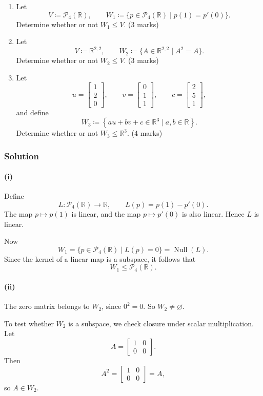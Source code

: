 \documentclass[12pt]{article}
\newcommand{\R}{\mathbb{R}}
\DeclareMathOperator{\Null}{Null}
\newcommand{\Pfour}{\mathcal{P}_4(\R)}
\begin{document}
\begin{enumerate}[label=(\roman*)]
\item Let
\[
V\coloneqq \Pfour,
\qquad
W_1\coloneqq \{p\in \Pfour \mid p(1)=p'(0)\}.
\]
Determine whether or not \(W_1\le V\).
\hfill (3 marks)

\item Let
\[
V\coloneqq \R^{2,2},
\qquad
W_2\coloneqq \{A\in \R^{2,2}\mid A^2=A\}.
\]
Determine whether or not \(W_2\le V\).
\hfill (3 marks)

\item Let
\[
u=\begin{bmatrix}1\\2\\0\end{bmatrix},
\qquad
v=\begin{bmatrix}0\\1\\1\end{bmatrix},
\qquad
c=\begin{bmatrix}2\\5\\1\end{bmatrix},
\]
and define
\[
W_3\coloneqq \left\{au+bv+c\in \R^3 \mid a,b\in\R\right\}.
\]
Determine whether or not \(W_3\le \R^3\).
\hfill (4 marks)
\end{enumerate}

\subsubsection{Solution}

\paragraph{(i)}
Define
\[
L:\Pfour \to \R,\qquad L(p)=p(1)-p'(0).
\]
The map \(p\mapsto p(1)\) is linear, and the map \(p\mapsto p'(0)\) is also linear. Hence \(L\) is linear.

Now
\[
W_1=\{p\in \Pfour\mid L(p)=0\}=\Null(L).
\]
Since the kernel of a linear map is a subspace, it follows that
\[
\boxed{W_1\le \Pfour.}
\]

\paragraph{(ii)}
The zero matrix belongs to \(W_2\), since \(0^2=0\). So \(W_2\neq\varnothing\).

To test whether \(W_2\) is a subspace, we check closure under scalar multiplication. Let
\[
A=\begin{bmatrix}1&0\\0&0\end{bmatrix}.
\]
Then
\[
A^2=\begin{bmatrix}1&0\\0&0\end{bmatrix}=A,
\]
so \(A\in W_2\).
\end{document}
